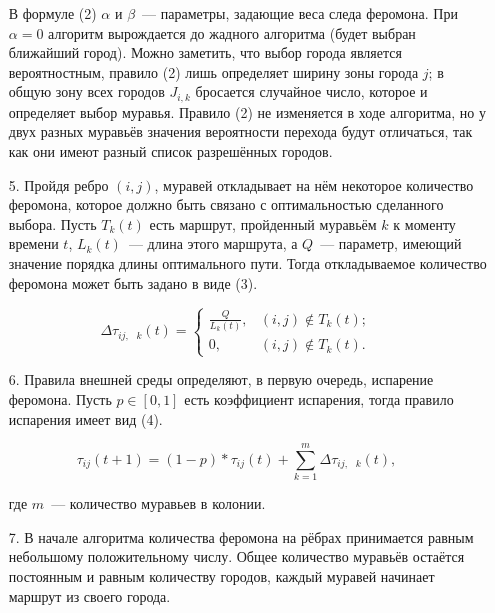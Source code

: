 \documentclass[12pt, a4paper]{report}
\begin{document}
	\begin{enumerate}
		\item[  ] В формуле (2) $\alpha$ и $\beta$~--- параметры, задающие веса следа феромона. При $\alpha = 0$ алгоритм вырождается до жадного 
		алгоритма (будет выбран ближайший город). Можно заметить, что выбор города является вероятностным, правило (2) лишь определяет ширину зоны города $j$; в общую зону всех городов $J_{i, k}$ бросается 
		случайное число, которое и определяет выбор муравья. Правило (2) не изменяется в ходе алгоритма, но у двух разных муравьёв значения вероятности перехода будут отличаться, так как они имеют разный список разрешённых городов.
		\item[5.] Пройдя ребро $(i,j)$, муравей откладывает на нём некоторое количество феромона, которое должно быть связано с оптимальностью сделанного выбора. Пусть $T_k(t)$ есть маршрут, пройденный муравьём $k$ к моменту времени $t$, $L_k(t)$~--- длина этого маршрута, а $Q$~--- параметр, имеющий значение порядка 
		длины оптимального пути. Тогда откладываемое количество феромона может быть задано в виде (3).
	\end{enumerate}
	
	\begin{equation}
		\Delta{\tau}_{ij,\text{ }k}(t) =
		\begin{cases}
			\frac{Q}{L_k(t)}, & (i, j) \notin T_k(t);
			\\
			0, & (i, j) \notin T_k(t).
		\end{cases}
	\end{equation}
	
	\begin{enumerate}
		\item[6.] Правила внешней среды определяют, в первую очередь, испарение феромона. Пусть $p \in [0, 1]$ есть коэффициент испарения, тогда правило испарения имеет вид (4).
	\end{enumerate}
	
	\begin{equation}
		{\tau}_{ij}(t+1)= (1-p)*{\tau}_{ij}(t)+ \displaystyle\sum_{k=1}^{m} \Delta{\tau_{ij,\text{ }k}}(t),
	\end{equation}
	
	\begin{enumerate}
		\item[  ] где $m$~--- количество муравьев в колонии.
		\item[7.] В начале алгоритма количества феромона на рёбрах принимается равным небольшому положительному числу. Общее количество муравьёв остаётся постоянным и равным количеству городов, каждый муравей начинает маршрут из своего города. 
	\end{enumerate}
	
\end{document}
